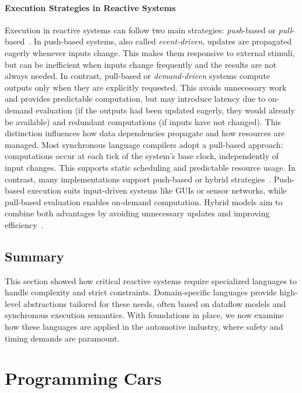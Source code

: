 \paragraph{Execution Strategies in Reactive Systems}
\label{sec:intro:dsl:dataflow:push_pull}

Execution in reactive systems can follow two main strategies: \emph{push}-based or
\emph{pull}-based~\cite{DBLP:conf/haskell/Elliott09}. In push-based systems, also called
\emph{event-driven}, updates are propagated eagerly whenever inputs change. This makes them
responsive to external stimuli, but can be inefficient when inputs change frequently and the
results are not always needed. In contrast, pull-based or \emph{demand-driven} systems compute
outputs only when they are explicitly requested. This avoids unnecessary work and provides
predictable computation, but may introduce latency due to on-demand evaluation (if the outputs had
been updated eagerly, they would already be available) and redundant computations (if inputs have
not changed).
%
This distinction influences how data dependencies propagate and how resources are managed. Most
synchronous language compilers adopt a pull-based approach: computations occur at each tick of the
system's base clock, independently of input changes. This supports static scheduling and
predictable resource usage. In contrast, many \frp implementations support push-based or hybrid
strategies~\cite{reactivex,DBLP:conf/pldi/CzaplickiC13,DBLP:conf/ppdp/MandelPP15}. Push-based
execution suits input-driven systems like GUIs or sensor networks, while pull-based evaluation
enables on-demand computation. Hybrid models aim to combine both advantages by avoiding unnecessary
updates and improving efficiency~\cite{DBLP:conf/haskell/Elliott09}.

\subsection{Summary}
\label{sec:intro:dsl:summary}

This section showed how critical reactive systems require specialized languages to handle
complexity and strict constraints. Domain-specific languages provide high-level abstractions
tailored for these needs, often based on dataflow models and synchronous execution semantics.
With foundations in place, we now examine how these languages are applied in the automotive
industry, where safety and timing demands are paramount.

\section{Programming Cars}
\label{sec:intro:cars}

